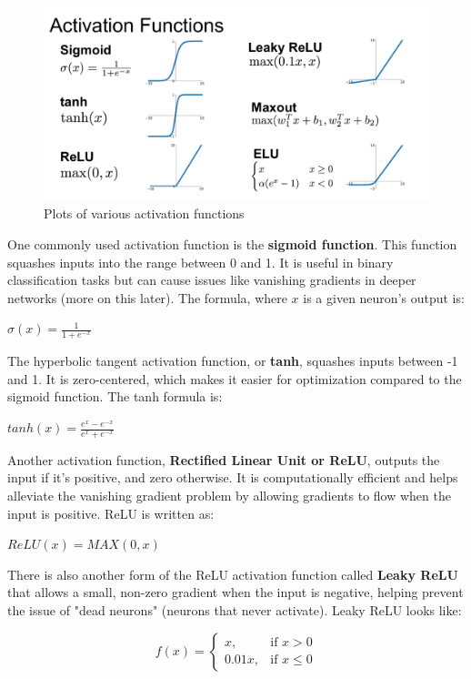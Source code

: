 \begin{flushleft}
\begin{figure}[H]
    \centering
    \includegraphics[width=0.75\linewidth]{dl/activationfuncs.png}
    \caption{Plots of various activation functions}
    \label{fig:activationfuncs}
\end{figure}
    \large One commonly used activation function is the \textbf{sigmoid function}. This function squashes inputs into the range between 0 and 1. It is useful in binary classification tasks but can cause issues like vanishing gradients in deeper networks (more on this later). The formula, where $x$ is a given neuron's output is:
    \begin{center}$\sigma(x) = \frac{1}{1+e^{-x}}$\end{center}
    The hyperbolic tangent activation function, or \textbf{tanh}, squashes inputs between -1 and 1. It is zero-centered, which makes it easier for optimization compared to the sigmoid function. The tanh formula is:
    \begin{center}$tanh(x) = \frac{e^x-e^{-x}}{e^x+e^{-x}}$\end{center}
    Another activation function, \textbf{Rectified Linear Unit or ReLU}, outputs the input if it's positive, and zero otherwise. It is computationally efficient and helps alleviate the vanishing gradient problem by allowing gradients to flow when the input is positive. ReLU is written as:
    \begin{center}$ReLU(x) = MAX(0,x)$\end{center}
    There is also another form of the ReLU activation function called \textbf{Leaky ReLU} that allows a small, non-zero gradient when the input is negative, helping prevent the issue of "dead neurons" (neurons that never activate). Leaky ReLU looks like:
    \begin{center}\[f(x)= 
        \begin{cases}
            x,& \text{if } x > 0\\
            0.01x,              & \text{if } x \leq 0
        \end{cases}
    \]\end{center}
\end{flushleft}

